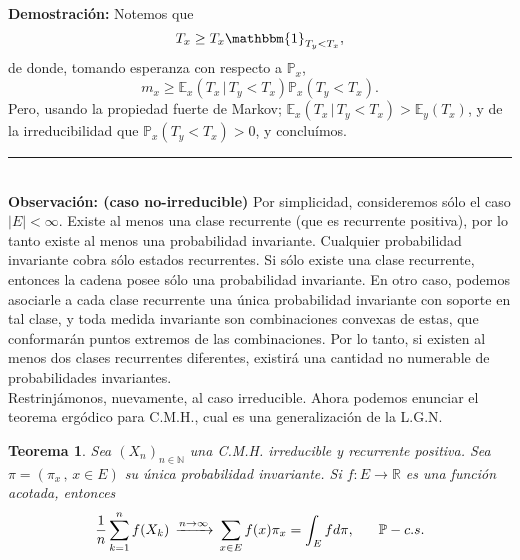 \documentclass[a4paper]{article}
\newcommand{\prob}{\mathbb{P}}
\newtheorem{teorema}{Teorema}
\numberwithin{equation}{subsection}
\def\R{\mathbb R}
\def\N{\mathbb N}
\def\E{\mathbb E}
\begin{document}
\textbf{Demostración: }Notemos que
\[T_x \geq T_x\mathbbm{1}_{T_y<T_x},\]
de donde, tomando esperanza con respecto a $\prob_x$,
\[m_x \geq \E_x(T_x\,|\,T_y<T_x)\prob_x(T_y<T_x).\]
Pero, usando la propiedad fuerte de Markov; $\E_x(T_x\,|\,T_y<T_x) > \E_y(T_x)$, y de la irreducibilidad que $\prob_x(T_y<T_x) >0$, y concluímos.\\
\rule{0.7em}{0.7em}\\ \newline
\textbf{Observación: (caso no-irreducible)} Por simplicidad, consideremos sólo el caso $|E|<\infty$. Existe al menos una clase recurrente (que es recurrente positiva), por lo tanto existe al menos una probabilidad invariante. Cualquier probabilidad invariante cobra sólo estados recurrentes. Si sólo existe una clase recurrente, entonces la cadena posee sólo una probabilidad invariante. En otro caso, podemos asociarle a cada clase recurrente una única probabilidad invariante  con soporte en tal clase, y toda medida invariante son combinaciones convexas de estas, que conformarán puntos extremos de las combinaciones. Por lo tanto, si existen al menos dos clases recurrentes diferentes, existirá una cantidad no numerable de probabilidades invariantes.\\ \newline
Restrinjámonos, nuevamente, al caso irreducible. Ahora podemos enunciar el teorema ergódico para C.M.H., cual es una generalización de la L.G.N.

\begin{teorema}
Sea $(X_n)_{n\in\N}$ una C.M.H. irreducible y recurrente positiva. Sea $\pi = (\pi_x\,,\,x\in E)$ su única probabilidad invariante. Si $f:E\rightarrow \R$ es una función acotada, entonces
\[\frac{1}{n}\sum_{k=1}^n f(X_k)\, \xrightarrow{n\rightarrow \infty}\,\sum_{x\in E}f(x)\pi_x = \int_E f d\pi,\hspace{0.6cm}\prob-c.s.\]
\end{teorema}
\end{document}
